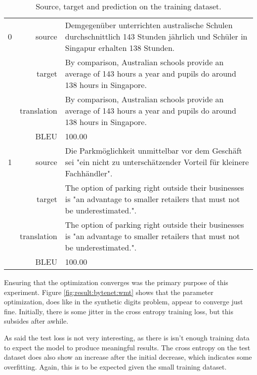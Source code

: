 \begin{table}[h]
\centering
\begin{tabular}{l|r|p{10cm}}
  0 & source & Demgegenüber unterrichten australische Schulen durchschnittlich 143 Stunden jährlich und Schüler in Singapur erhalten 138 Stunden. \\[0.1cm]
    & target & By comparison, Australian schools provide an average of 143 hours a year and pupils do around 138 hours in Singapore. \\[0.1cm]
    & translation & By comparison, Australian schools provide an average of 143 hours a year and pupils do around 138 hours in Singapore. \\[0.1cm]
    & BLEU & 100.00 \\[0.1cm] \hline
  1 & source & Die Parkmöglichkeit unmittelbar vor dem Geschäft sei "ein nicht zu unterschätzender Vorteil für kleinere Fachhändler". \\[0.1cm]
    & target & The option of parking right outside their businesses is "an advantage to smaller retailers that must not be underestimated.". \\[0.1cm]
    & translation & The option of parking right outside their businesses is "an advantage to smaller retailers that must not be underestimated.". \\[0.1cm]
    & BLEU & 100.00
\end{tabular}
\caption{Source, target and prediction on the training dataset.}
\label{table:result:bytenet:wmt-train}
\end{table}

Ensuring that the optimization converges was the primary purpose of this experiment. Figure \ref{fig:result:bytenet:wmt} shows that the parameter optimization, does like in the synthetic digits problem, appear to converge just fine. Initially, there is some jitter in the cross entropy training loss, but this subsides after awhile. 

As said the test loss is not very interesting, as there is isn't enough training data to expect the model to produce meaningful results. The cross entropy on the test dataset does also show an increase after the initial decrease, which indicates some overfitting. Again, this is to be expected given the small training dataset.

